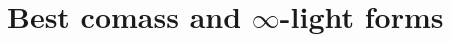 \documentclass[reqno,11pt]{amsart}
\newcommand*\dif{\mathop{}\!\mathrm{d}}
\newcommand{\cpt}{\mathrm{cpt}}
\newtheorem{corollary}[theorem]{Corollary}
\theoremstyle{definition}
\numberwithin{equation}{section}
\begin{document}




\section{Best comass and \texorpdfstring{$\infty$-light forms}{infinity-light forms}}
\end{document}
